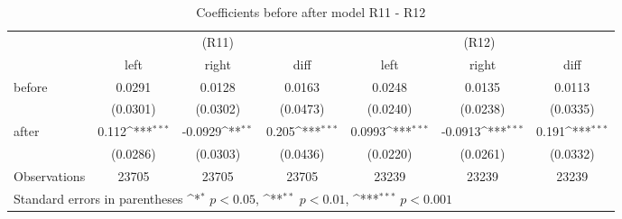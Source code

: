 \begin{table}[!ht]\centering \footnotesize
\def\sym#1{\ifmmode^{#1}\else\(^{#1}\)\fi}
\caption{Coefficients before after model R11 - R12}
\begin{tabular}{l*{6}{c}}
\hline\hline
                    &\multicolumn{3}{c}{(R11)}&\multicolumn{3}{c}{(R12)}\\
&\multicolumn{1}{c}{left}&\multicolumn{1}{c}{right}&\multicolumn{1}{c}{diff}&\multicolumn{1}{c}{left}&\multicolumn{1}{c}{right}&\multicolumn{1}{c}{diff}\\
\hline
before              &      0.0291         &      0.0128         &      0.0163         &      0.0248         &      0.0135         &      0.0113         \\
                    &    (0.0301)         &    (0.0302)         &    (0.0473)         &    (0.0240)         &    (0.0238)         &    (0.0335)         \\
[0.5em]
after               &       0.112\sym{***}&     -0.0929\sym{**} &       0.205\sym{***}&      0.0993\sym{***}&     -0.0913\sym{***}&       0.191\sym{***}\\
                    &    (0.0286)         &    (0.0303)         &    (0.0436)         &    (0.0220)         &    (0.0261)         &    (0.0332)         \\
\hline
Observations        &       23705         &       23705         &       23705         &       23239         &       23239         &       23239         \\
\hline\hline
\multicolumn{7}{l}{ Standard errors in parentheses \sym{*} \(p<0.05\), \sym{**} \(p<0.01\), \sym{***} \(p<0.001\)}\\
\end{tabular}
\end{table}
